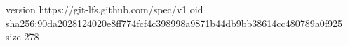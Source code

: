 version https://git-lfs.github.com/spec/v1
oid sha256:90da2028124020e8ff774fcf4c398998a9871b44db9bb38614cc480789a0f925
size 278
